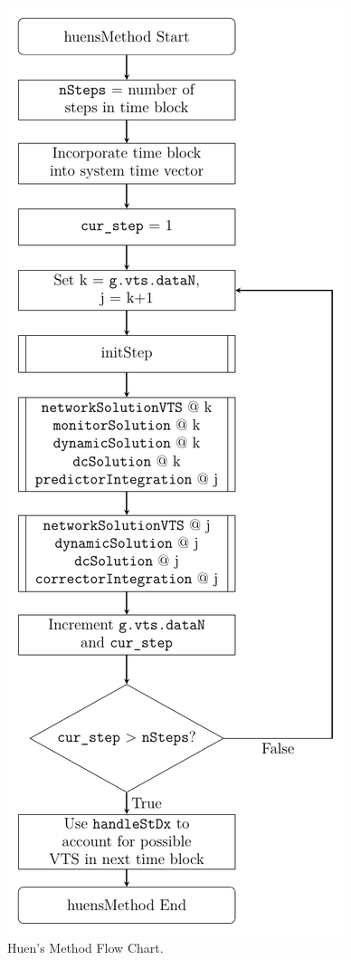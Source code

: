 \begin{figure}[H]
	\centering
	\footnotesize
	\includegraphics[height=.85\textheight]{../../one-offs/200913-huensMethodBlockDiagram/200913-huensMethodBlockDiagram}
	\caption{Huen's Method Flow Chart.}
	\label{fig: huens block diagram}
\end{figure}\vspace{-1 em}


